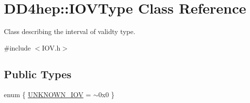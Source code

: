 \hypertarget{class_d_d4hep_1_1_i_o_v_type}{
\section{DD4hep::IOVType Class Reference}
\label{class_d_d4hep_1_1_i_o_v_type}
}


Class describing the interval of validty type.  


{\ttfamily \#include $<$IOV.h$>$}\subsection*{Public Types}
\begin{DoxyCompactItemize}
\item 
enum \{ \hyperlink{class_d_d4hep_1_1_i_o_v_type_acef1483c5ce503d44367cf75875c5797aa035632674476d28a4b2a6445303c220}{UNKNOWN\_\-IOV} =  $\sim$0x0
 \}
\end{DoxyCompactItemize}
